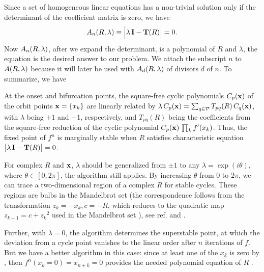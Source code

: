 \documentclass[twocolumn]{revtex4-1}
\begin{document}
Since a set of homogeneous linear equations
  has a non-trivial solution
  only if the determinant of the coefficient matrix
  is zero, we have
\begin{equation}
  A_n(R, \lambda) \equiv \Big| \lambda \, \mathbf{I} - \mathbf{T}(R) \Big| = 0.
\label{eq:xr}
\end{equation}
%
Now $A_n(R, \lambda)$, after we expand the determinant,
  is a polynomial of $R$ and $\lambda$,
  the equation is the desired answer to our problem.
%
We attach the subscript $n$ to $A(R, \lambda)$ because
  it will later be used with $A_d(R, \lambda)$ of divisors $d$ of $n$.
%
To summarize, we have
\begin{theorem}
  At the onset and bifurcation points,
  the square-free cyclic polynomials $C_p(\mathbf{x})$
  of the orbit points $\mathbf{x} = \{x_k\}$
  are linearly related by %
  $\lambda \, C_p(\mathbf{x}) = \sum_{q \in \mathcal P} T_{pq}(R) \, C_q(\mathbf{x})$,
  with $\lambda$ being $+1$ and $-1$, respectively,
  and $T_{pq}(R)$ being the coefficients
  from the square-free reduction of the cyclic polynomial
  $C_p(\mathbf{x}) \, \prod_k f'(x_k)$. %
  Thus, the fixed point of $f^n$
  is marginally stable when $R$ satisfies
  characteristic equation $\big| \lambda \, \mathbf{I} - \mathbf{T}(R) \big| = 0$.
  \label{thm:main}
\end{theorem}

\begin{remark}[1]
  For complex $R$ and $\mathbf{x}$,
  $\lambda$ should be generalized from $\pm1$
  to any $\lambda = \exp(i\theta)$,
  where $\theta \in [0, 2\pi]$,
  the algorithm still applies.
  By increasing $\theta$ from 0 to $2\pi$,
  we can trace a two-dimensional region of a complex $R$
  for stable cycles.
  These regions are bulbs in the Mandelbrot set
  (the correspondence follows from the transformation $z_k = -x_k, c = -R$, which
  reduces  to the quadratic map $z_{k+1} = c + {z_k}^2$
  used in the Mandelbrot set \cite{mandelbrot}),
  see ref. \cite{stephenson} and .

  Further, with $\lambda = 0$,
  the algorithm determines the superstable point,
  at which the deviation from a cycle point vanishes
  to the linear order after $n$ iterations of $f$.
  But we have a better algorithm in this case:
  since at least one of the $x_k$ is zero by ,
  then $f^n(x_k = 0) = x_{n+k} = 0$ provides
  the needed polynomial equation of $R$ \cite{strogatz}.
\end{remark}
\end{document}
